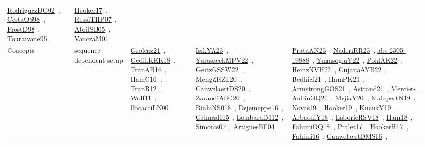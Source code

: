 {\begin{longtable}{lp{3cm}>{\raggedright\arraybackslash}p{6cm}>{\raggedright\arraybackslash}p{6cm}>{\raggedright\arraybackslash}p{8cm}}
\href{works/RodriguezDG02.pdf}{RodriguezDG02}~\cite{RodriguezDG02}, \href{works/CestaOS98.pdf}{CestaOS98}~\cite{CestaOS98}, \href{works/FrostD98.pdf}{FrostD98}~\cite{FrostD98}, \href{works/Touraivane95.pdf}{Touraivane95}~\cite{Touraivane95} & \href{works/Hooker17.pdf}{Hooker17}~\cite{Hooker17}, \href{works/RossiTHP07.pdf}{RossiTHP07}~\cite{RossiTHP07}, \href{works/AbrilSB05.pdf}{AbrilSB05}~\cite{AbrilSB05}, \href{works/VanczaM01.pdf}{VanczaM01}~\cite{VanczaM01}\\
Concepts & sequence dependent setup & \href{works/Groleaz21.pdf}{Groleaz21}~\cite{Groleaz21}, \href{works/GedikKEK18.pdf}{GedikKEK18}~\cite{GedikKEK18}, \href{works/TranAB16.pdf}{TranAB16}~\cite{TranAB16}, \href{works/HamC16.pdf}{HamC16}~\cite{HamC16}, \href{works/TranB12.pdf}{TranB12}~\cite{TranB12}, \href{works/Wolf11.pdf}{Wolf11}~\cite{Wolf11}, \href{works/FocacciLN00.pdf}{FocacciLN00}~\cite{FocacciLN00} & \href{works/IsikYA23.pdf}{IsikYA23}~\cite{IsikYA23}, \href{works/YuraszeckMPV22.pdf}{YuraszeckMPV22}~\cite{YuraszeckMPV22}, \href{works/GeitzGSSW22.pdf}{GeitzGSSW22}~\cite{GeitzGSSW22}, \href{works/MengZRZL20.pdf}{MengZRZL20}~\cite{MengZRZL20}, \href{works/CauwelaertDS20.pdf}{CauwelaertDS20}~\cite{CauwelaertDS20}, \href{works/ZarandiASC20.pdf}{ZarandiASC20}~\cite{ZarandiASC20}, \href{works/RiahiNS018.pdf}{RiahiNS018}~\cite{RiahiNS018}, \href{works/Dejemeppe16.pdf}{Dejemeppe16}~\cite{Dejemeppe16}, \href{works/GrimesH15.pdf}{GrimesH15}~\cite{GrimesH15}, \href{works/LombardiM12.pdf}{LombardiM12}~\cite{LombardiM12}, \href{works/Simonis07.pdf}{Simonis07}~\cite{Simonis07}, \href{works/ArtiguesBF04.pdf}{ArtiguesBF04}~\cite{ArtiguesBF04} & \href{works/PrataAN23.pdf}{PrataAN23}~\cite{PrataAN23}, \href{works/NaderiRR23.pdf}{NaderiRR23}~\cite{NaderiRR23}, \href{works/abs-2305-19888.pdf}{abs-2305-19888}~\cite{abs-2305-19888}, \href{works/YunusogluY22.pdf}{YunusogluY22}~\cite{YunusogluY22}, \href{works/PohlAK22.pdf}{PohlAK22}~\cite{PohlAK22}, \href{works/HeinzNVH22.pdf}{HeinzNVH22}~\cite{HeinzNVH22}, \href{works/OujanaAYB22.pdf}{OujanaAYB22}~\cite{OujanaAYB22}, \href{works/Bedhief21.pdf}{Bedhief21}~\cite{Bedhief21}, \href{works/HamPK21.pdf}{HamPK21}~\cite{HamPK21}, \href{works/ArmstrongGOS21.pdf}{ArmstrongGOS21}~\cite{ArmstrongGOS21}, \href{works/Astrand21.pdf}{Astrand21}~\cite{Astrand21}, \href{works/Mercier-AubinGQ20.pdf}{Mercier-AubinGQ20}~\cite{Mercier-AubinGQ20}, \href{works/MejiaY20.pdf}{MejiaY20}~\cite{MejiaY20}, \href{works/MalapertN19.pdf}{MalapertN19}~\cite{MalapertN19}, \href{works/Novas19.pdf}{Novas19}~\cite{Novas19}, \href{works/Hooker19.pdf}{Hooker19}~\cite{Hooker19}, \href{works/KucukY19.pdf}{KucukY19}~\cite{KucukY19}, \href{works/ArbaouiY18.pdf}{ArbaouiY18}~\cite{ArbaouiY18}, \href{works/LaborieRSV18.pdf}{LaborieRSV18}~\cite{LaborieRSV18}, \href{works/Ham18.pdf}{Ham18}~\cite{Ham18}, \href{works/FahimiOQ18.pdf}{FahimiOQ18}~\cite{FahimiOQ18}, \href{works/Pralet17.pdf}{Pralet17}~\cite{Pralet17}, \href{works/HookerH17.pdf}{HookerH17}~\cite{HookerH17}, \href{works/Fahimi16.pdf}{Fahimi16}~\cite{Fahimi16}, \href{works/CauwelaertDMS16.pdf}{CauwelaertDMS16}~\cite{CauwelaertDMS16}, 
\end{longtable}}

